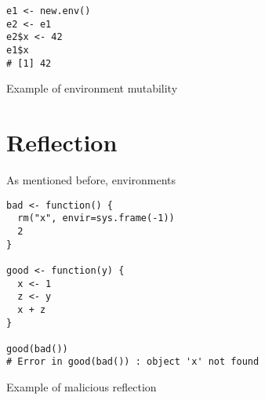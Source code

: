 \begin{listing}[h!]
	\centering
	\begin{verbatim}
e1 <- new.env()
e2 <- e1
e2$x <- 42
e1$x
# [1] 42
  \end{verbatim}
	\caption{Example of environment mutability}\label{lst:envir}
\end{listing}


\section{Reflection}

\todoadd
As mentioned before, environments

\begin{listing}
  \centering
  \begin{verbatim}
bad <- function() {
  rm("x", envir=sys.frame(-1))
  2
}

good <- function(y) {
  x <- 1
  z <- y
  x + z
}

good(bad())
# Error in good(bad()) : object 'x' not found
  \end{verbatim}
  \caption{Example of malicious reflection}\label{lst:bad-ref}
\end{listing}


